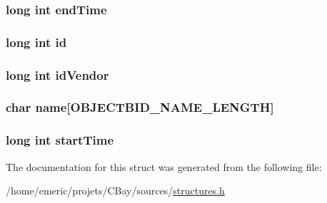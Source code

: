 \hypertarget{struct_object_bid_a03ea3a2cebde4b5cae63c7105339c294}{
\subsubsection[{end\-Time}]{\setlength{\rightskip}{0pt plus 5cm}long int end\-Time}}\label{struct_object_bid_a03ea3a2cebde4b5cae63c7105339c294}
\hypertarget{struct_object_bid_a53f4656a3ccbae3d40e94f582eef745f}{
\subsubsection[{id}]{\setlength{\rightskip}{0pt plus 5cm}long int id}}\label{struct_object_bid_a53f4656a3ccbae3d40e94f582eef745f}
\hypertarget{struct_object_bid_a56c855fe82a6ab9e09389c23a73eeec0}{
\subsubsection[{id\-Vendor}]{\setlength{\rightskip}{0pt plus 5cm}long int id\-Vendor}}\label{struct_object_bid_a56c855fe82a6ab9e09389c23a73eeec0}
\hypertarget{struct_object_bid_a8b0efa1f52a6b46d640cfcf93172083e}{
\subsubsection[{name}]{\setlength{\rightskip}{0pt plus 5cm}char name\mbox{[}{\bf O\-B\-J\-E\-C\-T\-B\-I\-D\-\_\-\-N\-A\-M\-E\-\_\-\-L\-E\-N\-G\-T\-H}\mbox{]}}}\label{struct_object_bid_a8b0efa1f52a6b46d640cfcf93172083e}
\hypertarget{struct_object_bid_a39256f6302441e1a26db958909e7431d}{
\subsubsection[{start\-Time}]{\setlength{\rightskip}{0pt plus 5cm}long int start\-Time}}\label{struct_object_bid_a39256f6302441e1a26db958909e7431d}


The documentation for this struct was generated from the following file\-:\begin{DoxyCompactItemize}
\item 
/home/emeric/projets/\-C\-Bay/sources/\hyperlink{structures_8h}{structures.\-h}\end{DoxyCompactItemize}
